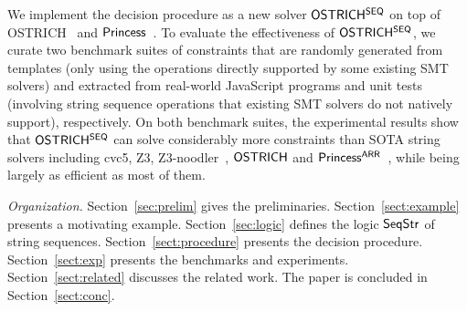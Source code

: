 We implement the decision procedure as a new solver ${\sf OSTRICH^{SEQ}}$ on top of OSTRICH~\cite{CHL+19} and ${\sf Princess}$~\cite{princess08}. To evaluate the effectiveness of ${\sf OSTRICH^{SEQ}}$, we curate two benchmark suites of constraints that 
are randomly generated from templates (only using
the operations directly supported by some existing SMT solvers) and extracted from real-world JavaScript programs and unit tests (involving string sequence operations that existing SMT solvers do not natively support), respectively. 
%
On both benchmark suites, the experimental results show that ${\sf OSTRICH^{SEQ}}$ can solve considerably more constraints
than SOTA string solvers including cvc5, Z3, Z3-noodler~\cite{ChenCHHLS24}, ${\sf OSTRICH}$ and ${\sf Princess^{ARR}}$~\cite{ruemmer2024princess}, while being largely as efficient as most of them. 


\smallskip
\noindent\emph{Organization.} %
Section~\ref{sec:prelim} gives the preliminaries. Section~\ref{sect:example} presents a motivating example. 
Section~\ref{sec:logic} defines the logic ${\sf SeqStr}$ of string sequences. Section~\ref{sect:procedure} presents the decision procedure. Section~\ref{sect:exp} presents the benchmarks and
experiments. 
Section~\ref{sect:related} discusses the related work. The paper is concluded in Section~\ref{sect:conc}.

